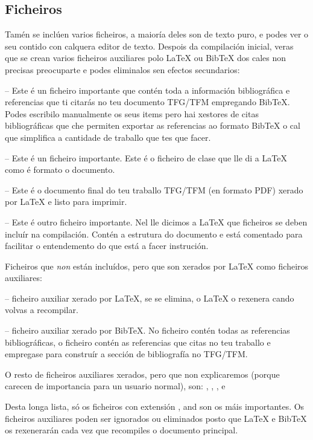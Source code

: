 \subsection{Ficheiros}

Tamén se inclúen varios ficheiros, a maioría deles son de texto puro, e podes ver o seu contido con calquera editor de texto. Despois da compilación inicial, veras que se crean varios ficheiros auxiliares polo \LaTeX{} ou BibTeX dos cales non precisas preocuparte e podes eliminalos sen efectos secundarios:

 -- Este é un ficheiro importante que contén toda a información bibliográfica e referencias que ti citarás no teu documento TFG/TFM empregando BibTeX. Podes escribilo manualmente os seus items pero hai xestores de citas bibliográficas que che permiten exportar as referencias ao formato BibTeX o cal que simplifica a cantidade de traballo que tes que facer.

 -- Este é un ficheiro importante. Este é o ficheiro de clase que lle di a \LaTeX{} como é formato o documento. 

 -- Este é o documento final do teu traballo TFG/TFM (en formato PDF) xerado por \LaTeX{} e listo para imprimir.

 -- Este é outro ficheiro importante. Nel lle dicimos a \LaTeX{} que ficheiros se deben incluír na compilación. Contén a estrutura do documento e está comentado para facilitar o entendemento do que está a facer instrución.

Ficheiros que \emph{non} están incluídos, pero que son xerados por \LaTeX{} como ficheiros auxiliares:

 -- ficheiro auxiliar xerado por \LaTeX{}, se se elimina, o \LaTeX{} o rexenera cando volvas a recompilar.

 -- ficheiro auxiliar xerado por BibTeX. No ficheiro  contén todas as referencias bibliográficas, o ficheiro  contén as referencias que citas no teu traballo e empregase para construír a sección de bibliografía no TFG/TFM.

O resto de ficheiros auxiliares xerados, pero que non explicaremos (porque carecen de importancia para un usuario normal), son: , , ,  e  

Desta longa lista, só os ficheiros con extensión ,  and  son os máis importantes. Os ficheiros auxiliares poden ser ignorados ou eliminados posto que \LaTeX{} e BibTeX os rexenerarán cada vez que recompiles o documento principal.

